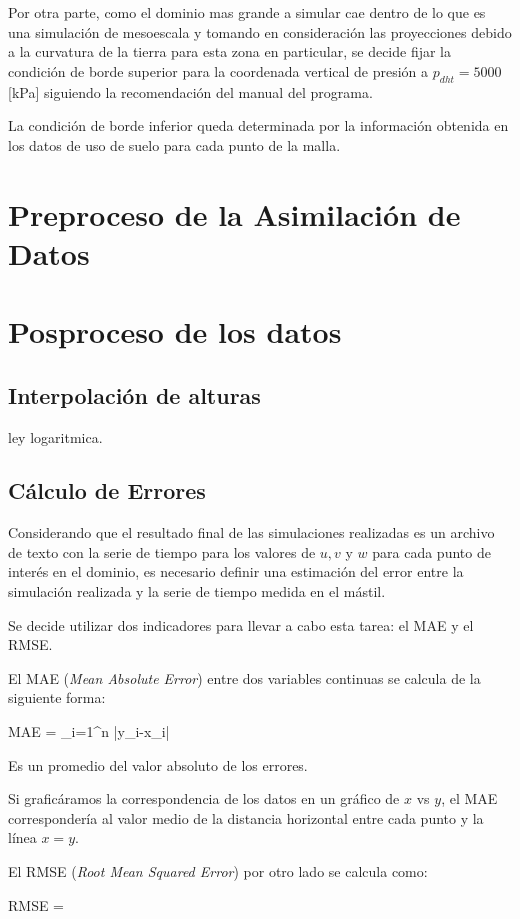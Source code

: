 Por otra parte, como el dominio mas grande a simular cae dentro de lo que es una simulación de mesoescala y tomando en consideración las proyecciones debido a la curvatura de la tierra para esta zona en particular, se decide fijar la condición de borde superior para la coordenada vertical de presión a $p_{dht} = 5000$ [kPa] siguiendo la recomendación del manual del programa.

La condición de borde inferior queda determinada por la información obtenida en los datos de uso de suelo para cada punto de la malla.
\section{Preproceso de la Asimilación de Datos}

\section{Posproceso de los datos}
\subsection{Interpolación de alturas}
ley logaritmica.
\subsection{Cálculo de Errores}
Considerando que el resultado final de las simulaciones realizadas es un archivo de texto con la serie de tiempo para los valores de $u,v$ y $w$ para cada punto de interés en el dominio, es necesario definir una estimación del error entre la simulación realizada y la serie de tiempo medida en el mástil.

Se decide utilizar dos indicadores para llevar a cabo esta tarea: el MAE y el RMSE.

El MAE (\emph{Mean Absolute Error}) entre dos variables continuas se calcula de la siguiente forma:

\be 
MAE = \sum_{i=1}^n |y_i-x_i|
\ee

Es un promedio del valor absoluto de los errores.

Si graficáramos la correspondencia de los datos en un gráfico de $x$ vs $y$, el MAE correspondería al valor medio de la distancia horizontal entre cada punto y la línea $x=y$.

El RMSE (\emph{Root Mean Squared Error}) por otro lado se calcula como:

\be 
RMSE = 
\ee

